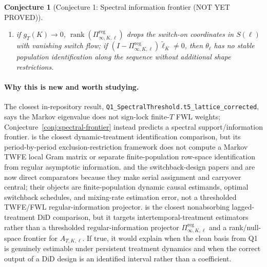 \documentclass[11pt]{article}
\theoremstyle{definition}
\theoremstyle{plain}
\newtheorem{conjecture}{Conjecture}
\theoremstyle{remark}
\begin{document}
\begin{conjecture}[Conjecture 1: Spectral information frontier (NOT YET PROVED)]
\begin{enumerate}[label=(\roman*)]
\item if \(g_T(K)\to0\), \(\operatorname{rank}(\Pi^{\mathrm{reg}}_{\infty,K,\ell})\) drops the switch-on coordinates in \(S(\ell)\) with vanishing switch flow; if \((I-\Pi^{\mathrm{reg}}_{\infty,K,\ell})\widetilde\ell_K\ne0\), then \(\theta_\ell\) has no stable population identification along the sequence without additional shape restrictions.
\end{enumerate}
\end{conjecture}
\paragraph{Why this is new and worth studying.}
The closest in-repository result, \texttt{Q1\_SpectralThreshold.t5\_lattice\_corrected}, says the Markov eigenvalue does not sign-lock finite-\(T\) FWL weights; Conjecture~\ref{conj:spectral-frontier} instead predicts a spectral support/information frontier.
\citet{han2021dynamic} is the closest dynamic-treatment identification comparison, but its period-by-period exclusion-restriction framework does not compute a Markov TWFE local Gram matrix or separate finite-population row-space identification from regular asymptotic information.
\citet{bojinov2021panel} and the switchback-design papers \citet{bojinov2023switchback} and \citet{hu2022switchback} are now direct comparators because they make serial assignment and carryover central; their objects are finite-population dynamic causal estimands, optimal switchback schedules, and mixing-rate estimation error, not a thresholded TWFE/FWL regular-information projector.
\citet{dechaisemartin2024intertemporal} is the closest nonabsorbing lagged-treatment DiD comparison, but it targets intertemporal-treatment estimators rather than a thresholded regular-information projector \(\Pi^{\mathrm{reg}}_{\infty,K,\ell}\) and a rank/null-space frontier for \(A_{T,K,\ell}\).
If true, it would explain when the clean basis from Q1 is genuinely estimable under persistent treatment dynamics and when the correct output of a DiD design is an identified interval rather than a coefficient.
\end{document}

